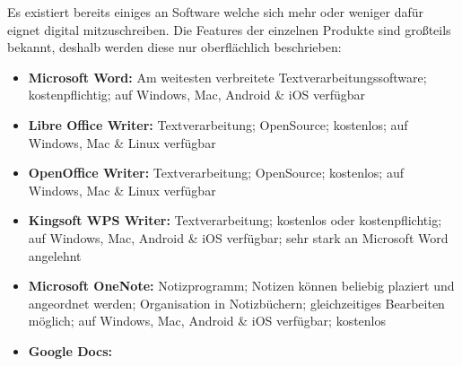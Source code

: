 
Es existiert bereits einiges an Software welche sich mehr oder weniger dafür eignet digital mitzuschreiben. Die Features der einzelnen Produkte sind großteils bekannt, deshalb werden diese nur oberflächlich beschrieben:

\begin{itemize}
\item \textbf{Microsoft Word:} Am weitesten verbreitete Textverarbeitungssoftware; kostenpflichtig; auf Windows, Mac, Android \& iOS verfügbar
\item \textbf{Libre Office Writer:} Textverarbeitung; OpenSource; kostenlos; auf Windows, Mac \& Linux verfügbar
\item \textbf{OpenOffice Writer:} Textverarbeitung; OpenSource; kostenlos; auf Windows, Mac \& Linux verfügbar
\item \textbf{Kingsoft WPS Writer:} Textverarbeitung; kostenlos oder kostenpflichtig; auf Windows, Mac, Android \& iOS verfügbar; sehr stark an Microsoft Word angelehnt
\item \textbf{Microsoft OneNote:} Notizprogramm; Notizen können beliebig plaziert und angeordnet werden; Organisation in Notizbüchern; gleichzeitiges Bearbeiten möglich; auf Windows, Mac, Android \& iOS verfügbar; kostenlos
\item \textbf{Google Docs:}
\end{itemize}
